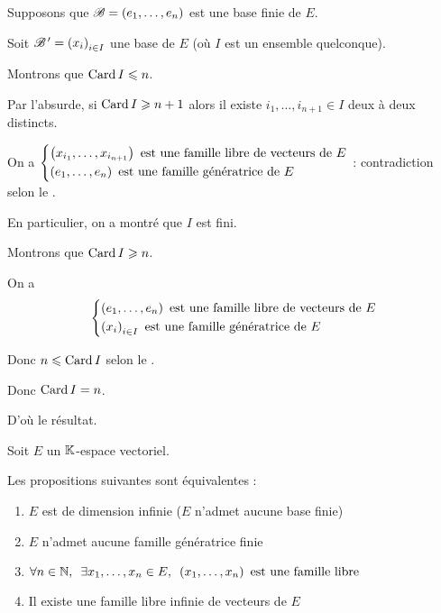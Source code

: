 \begin{dem}
Supposons que \(\mathscr{B}=\left(e_1,\dots,e_n\right)\) est une base finie de \(E\).

Soit \(\mathscr{B}^{\,\prime}=\left(x_i\right)_{i\in I}\) une base de \(E\) (où \(I\) est un ensemble quelconque).

Montrons que \(\operatorname{Card} I\leqslant n\).

Par l'absurde, si \(\operatorname{Card} I\geqslant n+1\) alors il existe \(i_1,\dots,i_{n+1}\in I\) deux à deux distincts.

On a \(\begin{dcases}
\left(x_{i_1},\dots,x_{i_{n+1}}\right)\text{ est une famille libre de vecteurs de }E \\
\left(e_1,\dots,e_n\right)\text{ est une famille génératrice de }E
\end{dcases}\) : contradiction selon le .

En particulier, on a montré que \(I\) est fini.

Montrons que \(\operatorname{Card} I\geqslant n\).

On a \[\begin{dcases}
\left(e_1,\dots,e_n\right)\text{ est une famille libre de vecteurs de }E \\
\left(x_i\right)_{i\in I}\text{ est une famille génératrice de }E
\end{dcases}\]

Donc \(n\leqslant\operatorname{Card} I\) selon le .

Donc \(\operatorname{Card} I=n\).

D'où le résultat.
\end{dem}

\begin{prop}
Soit \(E\) un \(\mathbb{K}\)-espace vectoriel.

Les propositions suivantes sont équivalentes :

\begin{enumerate}
\item \(E\) est de dimension infinie (\ie \(E\) n'admet aucune base finie) \\

\item \(E\) n'admet aucune famille génératrice finie \\

\item \(\quantifs{\forall n\in\N;\exists x_1,\dots,x_n\in E}\paren{x_1,\dots,x_n}\text{ est une famille libre}\) \\

\item Il existe une famille libre infinie de vecteurs de \(E\)
\end{enumerate}
\end{prop}

